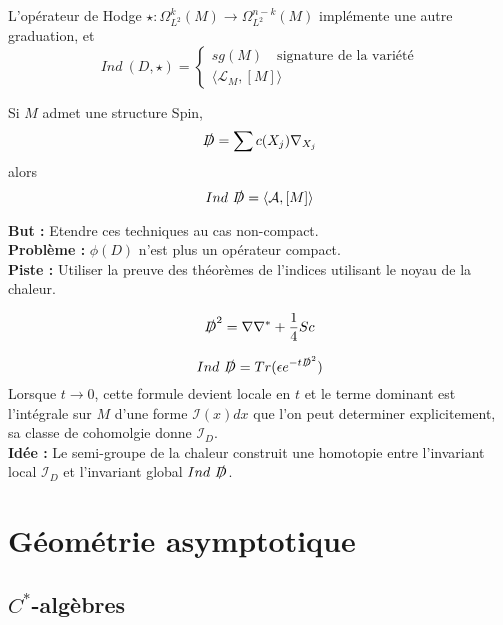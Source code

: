 \documentclass{beamer}
\begin{document}
\begin{frame}
L'opérateur de Hodge $\star : \Omega^{k}_{L^2}(M)\rightarrow \Omega_{L^2}^{n-k}(M)$ implémente une autre graduation, et 
\[Ind \ (D,\star) =\left\{ \begin{array}{l}sg(M)  \quad \text{signature de la variété}\\ \langle \mathcal L_M, [M]\rangle \end{array}\right.\]
\end{frame}

\begin{frame}
Si $M$ admet une structure Spin,
\[\slashed D = \sum c(X_j) \nabla_{X_j}\]
alors 
\[Ind \ \slashed D= \langle \mathcal A,[M]\rangle\]
\end{frame}

\begin{frame}
\textbf{But :} Etendre ces techniques au cas non-compact.\\

\textbf{Problème :} $\phi(D)$ n'est plus un opérateur compact.\\

\textbf{Piste :} Utiliser la preuve des théorèmes de l'indices utilisant le noyau de la chaleur.\\
\end{frame}

\begin{frame}
\begin{prop}
\[\slashed D^2 =\nabla \nabla^* +\frac{1}{4} Sc \]
\end{prop}

\[Ind \ \slashed D = Tr(\epsilon e^{-t\slashed D^2})\]
Lorsque $t\rightarrow 0$, cette formule devient locale en $t$ et le terme dominant est l'intégrale sur $M$ d'une forme $\mathcal I(x)dx$ que l'on peut determiner explicitement, sa classe de cohomolgie donne $\mathcal I_D$.\\

\textbf{Idée :} Le semi-groupe de la chaleur construit une homotopie entre l'invariant local $\mathcal I_D$ et l'invariant global $Ind \ \slashed D$.  
\end{frame}

\section{Géométrie asymptotique}
\subsection{$C^*$-algèbres}
\end{document}

